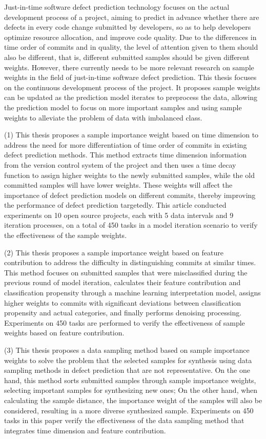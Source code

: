 \begin{englishabstract}
Just-in-time software defect prediction technology focuses on the actual development process of a project, aiming to predict in advance whether there are defects in every code change submitted by developers, so as to help developers optimize resource allocation, and improve code quality. Due to the differences in time order of commits and in quality, the level of attention given to them should also be different, that is, different submitted samples should be given different weights. However, there currently needs to be more relevant research on sample weights in the field of just-in-time software defect prediction. This thesis focuses on the continuous development process of the project. It proposes sample weights can be updated as the prediction model iterates to preprocess the data, allowing the prediction model to focus on more important samples and using sample weights to alleviate the problem of data with imbalanced class.

(1) This thesis proposes a sample importance weight based on time dimension to address the need for more differentiation of time order of commits in existing defect prediction methods. This method extracts time dimension information from the version control system of the project and then uses a time decay function to assign higher weights to the newly submitted samples, while the old committed samples will have lower weights. These weights will affect the importance of defect prediction models on different commits, thereby improving the performance of defect prediction targetedly. This article conducted experiments on 10 open source projects, each with 5 data intervals and 9 iteration processes, on a total of 450 tasks in a model iteration scenario to verify the effectiveness of the sample weights.

(2) This thesis proposes a sample importance weight based on feature contribution to address the difficulty in distinguishing commits at similar times. This method focuses on submitted samples that were misclassified during the previous round of model iteration, calculates their feature contribution and classification propensity through a machine learning interpretation model, assigns higher weights to commits with significant deviations between classification propensity and actual categories, and finally performs denoising processing. Experiments on 450 tasks are performed to verify the effectiveness of sample weights based on feature contribution.

(3) This thesis proposes a data sampling method based on sample importance weights to solve the problem that the selected samples for synthesis using data sampling methods in defect prediction that are not representative. On the one hand, this method sorts submitted samples through sample importance weights, selecting important samples for synthesizing new ones; On the other hand, when calculating the sample distance, the importance weight of the samples will also be considered, resulting in a more diverse synthesized sample. Experiments on 450 tasks in this paper verify the effectiveness of the data sampling method that integrates time dimension and feature contribution.


\end{englishabstract}
